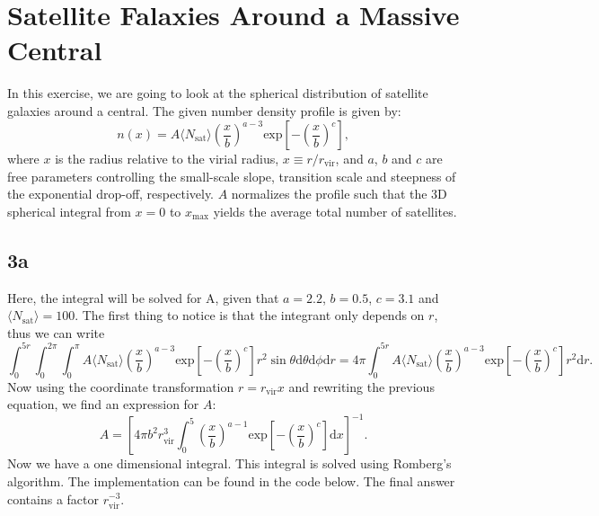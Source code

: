 \section{Satellite Falaxies Around a Massive Central}
In this exercise, we are going to look at the spherical distribution of satellite galaxies around a central. The given number density profile is given by:
\begin{equation}
  n(x) = A \langle N_\mathrm{sat}\rangle \left( \frac{x}{b} \right) ^{a-3} \mathrm{exp} \left[ - \left( \frac{x}{b} \right)^{c} \right],
\end{equation}
where $x$ is the radius relative to the virial radius, $x\equiv r/r_\mathrm{vir}$, and $a$, $b$ and $c$ are free parameters controlling the small-scale slope, transition scale and steepness of the exponential drop-off, respectively. $A$ normalizes the profile such that the 3D spherical integral from $x=0$ to $x_\mathrm{max}$ yields the average total number of satellites.

\subsection*{3a}
Here, the integral will be solved for A, given that $a = 2.2$, $b = 0.5$, $c = 3.1$ and $\langle N_\mathrm{sat}\rangle = 100$. The first thing to notice is that the integrant only depends on $r$, thus we can write
\begin{equation}
  \int_0^{5r} \int_0^{2\pi} \int_0^{\pi} A \langle N_\mathrm{sat}\rangle \left( \frac{x}{b} \right) ^{a-3} \mathrm{exp} \left[ - \left( \frac{x}{b} \right)^{c} \right] r^2 \sin\theta \mathrm{d}\theta \mathrm{d}\phi \mathrm{d}r = 4\pi \int_0^{5r} A \langle N_\mathrm{sat}\rangle \left( \frac{x}{b} \right) ^{a-3} \mathrm{exp} \left[ - \left( \frac{x}{b} \right)^{c} \right] r^2 \mathrm{d}r.
\end{equation}
Now using the coordinate transformation $r = r_{\mathrm{vir}}x$ and rewriting the previous equation, we find an expression for $A$:
\begin{equation}
  A = \left[ 4\pi b^2 r_{\mathrm{vir}}^3 \int_0^5 \left( \frac{x}{b} \right)^{a-1} \mathrm{exp} \left[ - \left( \frac{x}{b} \right)^{c} \right] \mathrm{d}x   \right]^{-1}.
\end{equation}
Now we have a one dimensional integral. This integral is solved using Romberg's algorithm. The implementation can be found in the code below. The final answer contains a factor $r_\mathrm{{vir}}^{-3}$.

